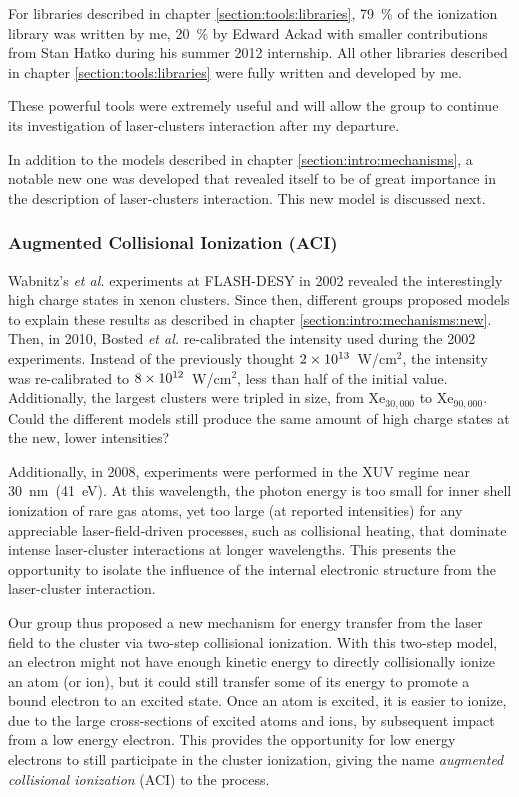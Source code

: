 For libraries described in chapter \ref{section:tools:libraries}, 79~\% of the
ionization library was written by me, 20~\% by Edward Ackad with smaller
contributions from Stan Hatko during his summer 2012 internship. All other
libraries described in chapter \ref{section:tools:libraries} were fully
written and developed by me.

These powerful tools were extremely useful and will allow
the group to continue its investigation of laser-clusters interaction
after my departure.

In addition to the models described in
chapter \ref{section:intro:mechanisms}, a notable new one was
developed that revealed itself to be of great importance in the description of
laser-clusters interaction. This new model is discussed next.


\subsubsection{Augmented Collisional Ionization (ACI)}

Wabnitz's \textit{et al.} experiments at FLASH-DESY in 2002 revealed the
interestingly high charge states in xenon clusters. Since then, different groups
proposed models to explain these results as described in chapter
\ref{section:intro:mechanisms:new}.
Then, in 2010, Bosted \textit{et al.}
re-calibrated the intensity used during the 2002 experiments.
Instead of the previously thought $\ten{2}{13}$~W/cm$^2$, the intensity was
re-calibrated to $\ten{8}{12}$~W/cm$^2$, less than half of the initial value.
Additionally, the largest clusters were tripled in size, from Xe$_{30,000}$
to Xe$_{90,000}$.
Could the different models still produce the same amount of high charge states
at the new, lower intensities?

Additionally, in 2008, experiments \cite{Bostedt2008,Murphy2008b} were performed
in the XUV regime near 30~nm~(41~eV). At this wavelength, the photon energy is
too small for inner shell ionization of rare gas atoms, yet too large
(at reported intensities) for any appreciable laser-field-driven processes, such
as collisional heating, that dominate intense laser-cluster interactions at
longer wavelengths. This presents the opportunity to isolate the influence of
the internal electronic structure from the laser-cluster interaction.

Our group thus proposed a new mechanism for energy transfer from the laser field
to the cluster via two-step collisional ionization. With this two-step model, an
electron might not have enough kinetic energy to directly collisionally ionize
an atom (or ion), but it could still transfer some of
its energy to promote a bound electron to an excited state. Once an atom is
excited, it is easier to ionize, due to the large cross-sections of excited
atoms and ions, by subsequent impact from a low energy electron. This provides the
opportunity for low energy electrons to still participate in the cluster
ionization, giving the name \textit{augmented collisional ionization} (ACI) to
the process.

